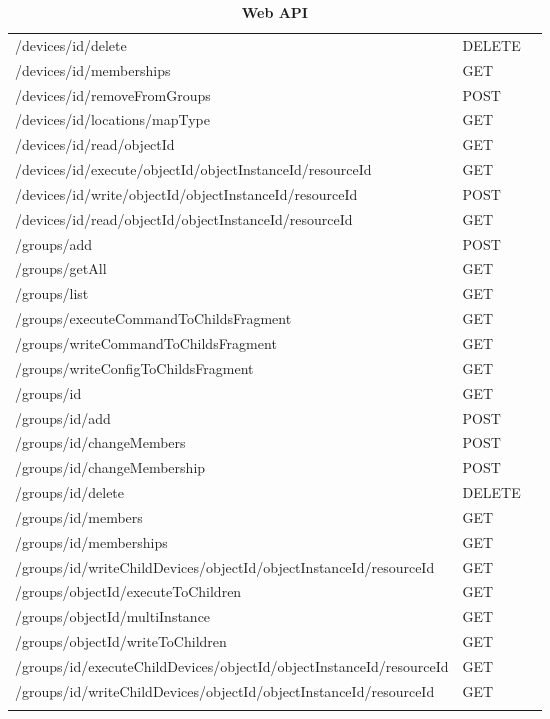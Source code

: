 \begin{longtable}{ p{11cm} p{4cm} l}
/devices/{id}/delete	&	DELETE	 \\ \addlinespace
/devices/{id}/memberships	&	GET	 \\ \addlinespace
/devices/{id}/removeFromGroups	&	POST	 \\ \addlinespace
/devices/{id}/locations/{mapType}	&	GET	 \\ \addlinespace
/devices/{id}/read/{objectId}	&	GET	 \\ \addlinespace
/devices/{id}/execute/{objectId}/{objectInstanceId}/{resourceId}	&	GET	 \\ \addlinespace
/devices/{id}/write/{objectId}/{objectInstanceId}/{resourceId}	&	POST	 \\ \addlinespace
/devices/{id}/read/{objectId}/{objectInstanceId}/{resourceId}	&	GET	 \\ \addlinespace
/groups/add	&	POST	 \\ \addlinespace
/groups/getAll	&	GET	 \\ \addlinespace
/groups/list	&	GET	 \\ \addlinespace
/groups/executeCommandToChildsFragment	&	GET	 \\ \addlinespace
/groups/writeCommandToChildsFragment	&	GET	 \\ \addlinespace
/groups/writeConfigToChildsFragment	&	GET	 \\ \addlinespace
/groups/{id}	&	GET	 \\ \addlinespace
/groups/{id}/add	&	POST	 \\ \addlinespace
/groups/{id}/changeMembers	&	POST	 \\ \addlinespace
/groups/{id}/changeMembership	&	POST	 \\ \addlinespace
/groups/{id}/delete	&	DELETE	 \\ \addlinespace
/groups/{id}/members	&	GET	 \\ \addlinespace
/groups/{id}/memberships	&	GET	 \\ \addlinespace
/groups/{id}/writeChildDevices/{objectId}/{objectInstanceId}/{resourceId}	&	GET	 \\ \addlinespace
/groups/{objectId}/executeToChildren	&	GET	 \\ \addlinespace
/groups/{objectId}/multiInstance	&	GET	 \\ \addlinespace
/groups/{objectId}/writeToChildren	&	GET	 \\ \addlinespace
/groups/{id}/executeChildDevices/{objectId}/{objectInstanceId}/{resourceId}	&	GET	 \\ \addlinespace
/groups/{id}/writeChildDevices/{objectId}/{objectInstanceId}/{resourceId}	&	GET	 \\ \addlinespace

\hline\caption{\textbf{Web API}}
\end{longtable}

